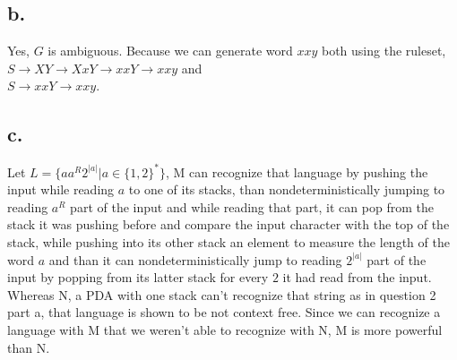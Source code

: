 \documentclass[12pt]{article}
\begin{document}
\subsection*{b.}
Yes, $G$ is ambiguous. Because we can generate word $xxy$ both using the ruleset,\\
$S\rightarrow XY \rightarrow XxY \rightarrow xxY \rightarrow xxy$ and \\
$S\rightarrow xxY \rightarrow xxy$.

\hspace{3cm}

\subsection*{c.}
Let $L=\{aa^R2^{|a|}|a\in \{1,2\}^*\}$, M can recognize that language by pushing the input
while reading $a$ to one of its stacks, than nondeterministically jumping to reading $a^R$
part of the input and while reading that part, it can pop from the stack it was pushing
before and compare the input character with the top of the stack, while pushing into
its other stack an element to measure the length of the word $a$ and than it can
nondeterministically jump to reading $2^{|a|}$ part of the input by popping from its
latter stack for every $2$ it had read from the input. Whereas N, a PDA with one stack
can't recognize that string as in question 2 part a, that language is shown to be not context
free. Since we can recognize a language with M that we weren't able to recognize with N,
M is more powerful than N.
\end{document}
